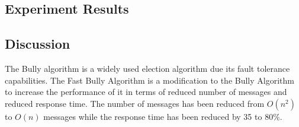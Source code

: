 \documentclass[dareport.tex]{subfiles}
\begin{document}
\subsection{Experiment Results}
\subsection{Discussion}
The Bully algorithm is a widely used election algorithm due its fault tolerance capabilities. The Fast Bully Algorithm is a modification to the Bully Algorithm to increase the performance of it in terms of reduced number of messages and reduced response time. The number of messages has been reduced from $ O(n^2) $ to $ O(n) $ messages while the response time has been reduced by 35 to 80\%.
\end{document}
